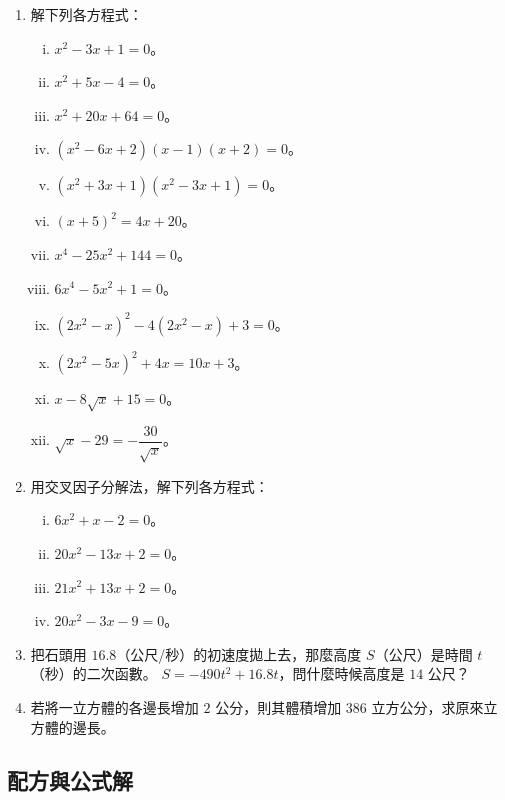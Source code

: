 \begin{enumerate}
  \item 解下列各方程式：
  \begin{enumerate}[(i)]
    \item $x^2-3x+1=0$。
    \item $x^2+5x-4=0$。
    \item $x^2+20x+64=0$。
    \item $(x^2-6x+2)(x-1)(x+2)=0$。
    \item $(x^2+3x+1)(x^2-3x+1)=0$。
    \item $(x+5)^2=4x+20$。
    \item $x^4-25x^2+144=0$。
    \item $6x^4-5x^2+1=0$。
    \item $(2x^2-x)^2 - 4(2x^2-x) + 3 = 0$。
    \item $(2x^2-5x)^2+4x=10x+3$。
    \item $x-8\sqrt{x}+15=0$。
    \item $\sqrt{x}-29=-\dfrac{30}{\sqrt{x}}$。
  \end{enumerate}

  \item 用交叉因子分解法，解下列各方程式：
  \begin{enumerate}[(i)]
    \item $6x^2+x-2=0$。
    \item $20x^2-13x+2=0$。
    \item $21x^2+13x+2=0$。
    \item $20x^2-3x-9=0$。
  \end{enumerate}

  \item 把石頭用 $16.8$（公尺/秒）的初速度拋上去，那麼高度 $S$（公尺）是時間 $t$（秒）的二次函數。 $S=-490t^2+16.8t$\label{note:b2-ch1-gravity}，問什麼時候高度是 $14$ 公尺？

  \item 若將一立方體的各邊長增加 $2$ 公分，則其體積增加 $386$ 立方公分，求原來立方體的邊長。
\end{enumerate}

\subsection{配方與公式解}\label{sec:b2_1-2}

